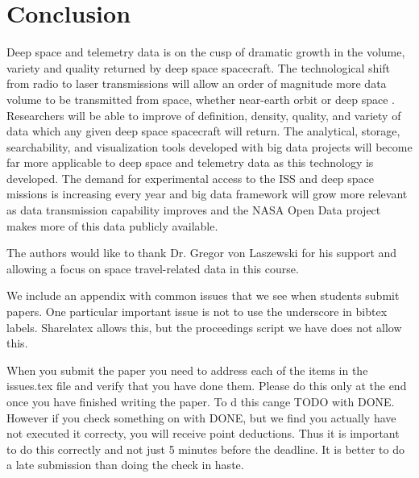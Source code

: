 \documentclass[sigconf]{acmart}
\begin{document}
\section{Conclusion}
Deep space and telemetry data is on the cusp of dramatic growth in the volume, variety and quality returned by deep space spacecraft. The technological shift from radio to laser transmissions will allow an order of magnitude more data volume to be transmitted from space, whether near-earth orbit or deep space \cite{Jacobson2016}. Researchers will be able to improve of definition, density, quality, and variety of data which any given deep space spacecraft will return. The analytical, storage, searchability, and visualization tools developed with big data projects will become far more applicable to deep space and telemetry data as this technology is developed. The demand for experimental access to the ISS and deep space missions is increasing every year \cite{Jacobson2016,Betts2017} and big data framework will grow more relevant as data transmission capability improves and the NASA Open Data project makes more of this data publicly available. 

\begin{acks}

  The authors would like to thank Dr. Gregor von Laszewski for his
  support and allowing a focus on space travel-related data in this course. 

\end{acks}


 

\appendix

We include an appendix with common issues that we see when students
submit papers. One particular important issue is not to use the
underscore in bibtex labels. Sharelatex allows this, but the
proceedings script we have does not allow this.

When you submit the paper you need to address each of the items in the
issues.tex file and verify that you have done them. Please do this
only at the end once you have finished writing the paper. To d this
cange TODO with DONE. However if you check something on with DONE, but
we find you actually have not executed it correcty, you will receive
point deductions. Thus it is important to do this correctly and not
just 5 minutes before the deadline. It is better to do a late
submission than doing the check in haste. 


\end{document}

